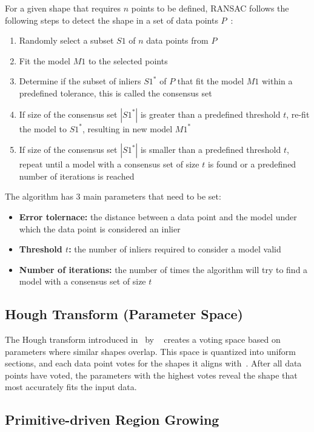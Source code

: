 For a given shape that requires $n$ points to be defined, RANSAC follows the following steps to detect the shape
in a set of data points $P$~\parencite{fischler_random_1981}:
\begin{enumerate}
    \item Randomly select a subset $S1$ of $n$ data points from $P$
    \item Fit the model $M1$ to the selected points
    \item Determine if the subset of inliers $S1^*$ of $P$ that fit the model $M1$ within a predefined tolerance, this is called the consensus set
    \item If size of the consensus set $|S1^*|$ is greater than a predefined threshold $t$, re-fit the model to $S1^*$, resulting in new model $M1^*$
    \item If size of the consensus set $|S1^*|$ is smaller than a predefined threshold $t$, repeat until a model with a consensus set of size $t$ is found or a predefined number of iterations is reached
\end{enumerate}

The algorithm has 3 main parameters that need to be set:
\begin{itemize}
    \item \textbf{Error tolernace:} the distance between a data point and the model under which the data point is considered an inlier
    \item \textbf{Threshold $t$:} the number of inliers required to consider a model valid
    \item \textbf{Number of iterations:} the number of times the algorithm will try to find a model with a consensus set of size $t$
\end{itemize}


\subsection{Hough Transform (Parameter Space)}
The Hough transform introduced in~\citeyear{hough_method_1962} by \citeauthor{hough_method_1962}~\parencite{hough_method_1962} creates a voting space based on parameters where similar shapes overlap.
This space is quantized into uniform sections, and each data point votes for the shapes it aligns with~\parencite{duda_use_1972}.
After all data points have voted, the parameters with the highest votes reveal the shape that most accurately fits the input data.

\subsection{Primitive-driven Region Growing}

